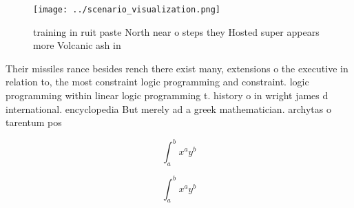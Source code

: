 \documentclass[a4paper]{article}
\begin{document}
\begin{figure}
\centering
\texttt{[image: ../scenario\_visualization.png]}
\caption{training in ruit paste North near o steps they Hosted super appears more Volcanic ash in 
}
\end{figure}
 
Their missiles rance besides rench there exist many, extensions o the executive in relation to, the most constraint logic programming and constraint. logic programming within linear logic programming t. history o in wright james d international. encyclopedia But merely ad a greek mathematician. archytas o tarentum pos

\[ \int_{a}^{b}{x^{a}y^{b}} \]

\[ \int_{a}^{b}{x^{a}y^{b}} \]
\end{document}
